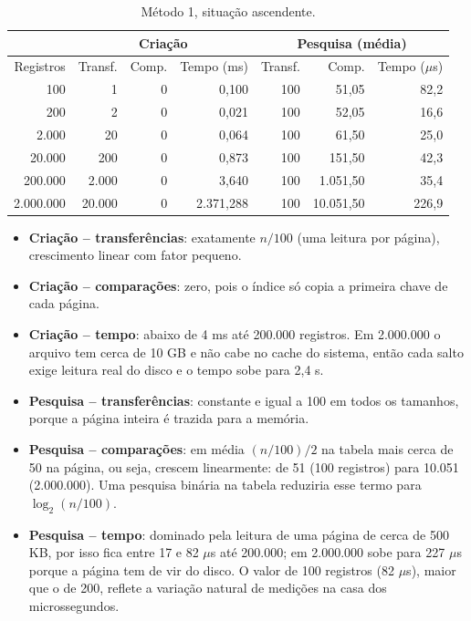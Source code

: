 \documentclass{article}
\begin{document}
\begin{table}[!htb]
    \centering
    \small
    \begin{tabular}{|r|r|r|r|r|r|r|}
        \hline\hline
        & \multicolumn{3}{c|}{Criação} & \multicolumn{3}{c|}{Pesquisa (média)} \\\hline
        Registros & Transf. & Comp. & Tempo (ms) & Transf. & Comp. & Tempo ($\mu$s) \\\hline
        100       & 1      & 0 & 0,100     & 100 & 51,05     & 82,2 \\
        200       & 2      & 0 & 0,021     & 100 & 52,05     & 16,6 \\
        2.000     & 20     & 0 & 0,064     & 100 & 61,50     & 25,0 \\
        20.000    & 200    & 0 & 0,873     & 100 & 151,50    & 42,3 \\
        200.000   & 2.000  & 0 & 3,640     & 100 & 1.051,50  & 35,4 \\
        2.000.000 & 20.000 & 0 & 2.371,288 & 100 & 10.051,50 & 226,9 \\\hline\hline
    \end{tabular}
    \caption{\label{tab:m1}Método 1, situação ascendente.}
\end{table}

\begin{itemize}
    \item \textbf{Criação -- transferências}: exatamente $n/100$ (uma leitura por página), crescimento linear com fator pequeno.
    \item \textbf{Criação -- comparações}: zero, pois o índice só copia a primeira chave de cada página.
    \item \textbf{Criação -- tempo}: abaixo de 4 ms até 200.000 registros. Em 2.000.000 o arquivo tem cerca de 10 GB e não cabe no cache do sistema, então cada salto exige leitura real do disco e o tempo sobe para 2,4 s.
    \item \textbf{Pesquisa -- transferências}: constante e igual a 100 em todos os tamanhos, porque a página inteira é trazida para a memória.
    \item \textbf{Pesquisa -- comparações}: em média $(n/100)/2$ na tabela mais cerca de 50 na página, ou seja, crescem linearmente: de 51 (100 registros) para 10.051 (2.000.000). Uma pesquisa binária na tabela reduziria esse termo para $\log_2(n/100)$.
    \item \textbf{Pesquisa -- tempo}: dominado pela leitura de uma página de cerca de 500 KB, por isso fica entre 17 e 82 $\mu$s até 200.000; em 2.000.000 sobe para 227 $\mu$s porque a página tem de vir do disco. O valor de 100 registros (82 $\mu$s), maior que o de 200, reflete a variação natural de medições na casa dos microssegundos.
\end{itemize}
\end{document}
